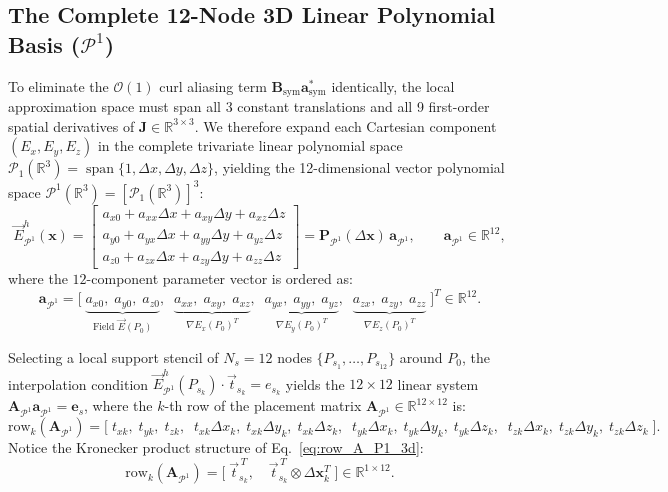 \documentclass[preprint,12pt]{elsarticle}
\newcommand{\R}{\mathbb{R}}
\begin{document}
\subsection{The Complete 12-Node 3D Linear Polynomial Basis ($\mathcal{P}^1$)}
\label{subsec:complete_p1_3d}

To eliminate the $\mathcal{O}(1)$ curl aliasing term $\mathbf{B}_{\text{sym}}\mathbf{a}_{\text{sym}}^*$ identically, the local approximation space must span all 3 constant translations and all 9 first-order spatial derivatives of $\mathbf{J} \in \R^{3\times 3}$. We therefore expand each Cartesian component $(E_x, E_y, E_z)$ in the complete trivariate linear polynomial space $\mathcal{P}_1(\R^3) = \operatorname{span}\{1, \Delta x, \Delta y, \Delta z\}$, yielding the 12-dimensional vector polynomial space $\mathcal{P}^1(\R^3) = [\mathcal{P}_1(\R^3)]^3$:
\begin{equation}
    \vec{E}^h_{\mathcal{P}^1}(\mathbf{x}) = \begin{bmatrix}
    a_{x0} + a_{xx}\Delta x + a_{xy}\Delta y + a_{xz}\Delta z \\
    a_{y0} + a_{yx}\Delta x + a_{yy}\Delta y + a_{yz}\Delta z \\
    a_{z0} + a_{zx}\Delta x + a_{zy}\Delta y + a_{zz}\Delta z
    \end{bmatrix} = \mathbf{P}_{\mathcal{P}^1}(\Delta\mathbf{x})\,\mathbf{a}_{\mathcal{P}^1}, \qquad \mathbf{a}_{\mathcal{P}^1} \in \R^{12},
    \label{eq:p1_expansion_3d}
\end{equation}
where the $12$-component parameter vector is ordered as:
\begin{equation}
    \mathbf{a}_{\mathcal{P}^1} = \Big[\; \underbrace{a_{x0}, \; a_{y0}, \; a_{z0}}_{\text{Field } \vec{E}(P_0)}, \;\; \underbrace{a_{xx}, \; a_{xy}, \; a_{xz}}_{\nabla E_x(P_0)^T}, \;\; \underbrace{a_{yx}, \; a_{yy}, \; a_{yz}}_{\nabla E_y(P_0)^T}, \;\; \underbrace{a_{zx}, \; a_{zy}, \; a_{zz}}_{\nabla E_z(P_0)^T} \;\Big]^T \in \R^{12}.
    \label{eq:a_p1_vector_3d}
\end{equation}

Selecting a local support stencil of $N_s = 12$ nodes $\{P_{s_1}, \dots, P_{s_{12}}\}$ around $P_0$, the interpolation condition $\vec{E}^h_{\mathcal{P}^1}(P_{s_k})\cdot\vec{t}_{s_k} = e_{s_k}$ yields the $12\times 12$ linear system $\mathbf{A}_{\mathcal{P}^1}\mathbf{a}_{\mathcal{P}^1} = \mathbf{e}_s$, where the $k$-th row of the placement matrix $\mathbf{A}_{\mathcal{P}^1} \in \R^{12\times 12}$ is:
\begin{equation}
    \text{row}_k(\mathbf{A}_{\mathcal{P}^1}) = \Big[\; t_{xk}, \; t_{yk}, \; t_{zk}, \;\; t_{xk}\Delta x_k, \; t_{xk}\Delta y_k, \; t_{xk}\Delta z_k, \;\; t_{yk}\Delta x_k, \; t_{yk}\Delta y_k, \; t_{yk}\Delta z_k, \;\; t_{zk}\Delta x_k, \; t_{zk}\Delta y_k, \; t_{zk}\Delta z_k \;\Big].
    \label{eq:row_A_P1_3d}
\end{equation}
Notice the Kronecker product structure of Eq.~\eqref{eq:row_A_P1_3d}:
\begin{equation}
    \text{row}_k(\mathbf{A}_{\mathcal{P}^1}) = \Big[\; \vec{t}_{s_k}^{\,T}, \quad \vec{t}_{s_k}^{\,T} \otimes \Delta\mathbf{x}_k^T \;\Big] \in \R^{1\times 12}.
    \label{eq:kronecker_row_3d}
\end{equation}
\end{document}

